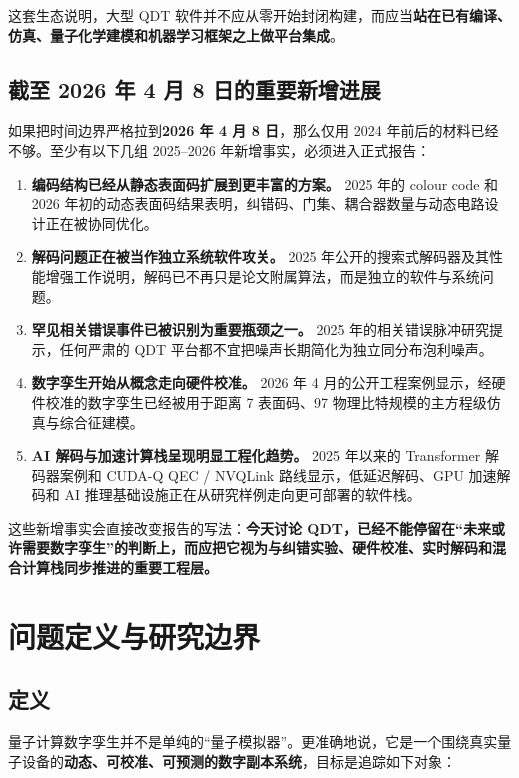 \documentclass[11pt,a4paper]{article}
\newcommand{\QDT}{QDT}
\begin{document}
这套生态说明，大型 \QDT{} 软件并不应从零开始封闭构建，而应当\textbf{站在已有编译、仿真、量子化学建模和机器学习框架之上做平台集成}。

\subsection{截至 2026 年 4 月 8 日的重要新增进展}

如果把时间边界严格拉到\textbf{2026 年 4 月 8 日}，那么仅用 2024 年前后的材料已经不够。至少有以下几组 2025--2026 年新增事实，必须进入正式报告：

\begin{enumerate}
  \item \textbf{编码结构已经从静态表面码扩展到更丰富的方案。} 2025 年的 colour code 和 2026 年初的动态表面码结果表明，纠错码、门集、耦合器数量与动态电路设计正在被协同优化。
  \item \textbf{解码问题正在被当作独立系统软件攻关。} 2025 年公开的搜索式解码器及其性能增强工作说明，解码已不再只是论文附属算法，而是独立的软件与系统问题。
  \item \textbf{罕见相关错误事件已被识别为重要瓶颈之一。} 2025 年的相关错误脉冲研究提示，任何严肃的 \QDT{} 平台都不宜把噪声长期简化为独立同分布泡利噪声。
  \item \textbf{数字孪生开始从概念走向硬件校准。} 2026 年 4 月的公开工程案例显示，经硬件校准的数字孪生已经被用于距离 7 表面码、97 物理比特规模的主方程级仿真与综合征建模。
  \item \textbf{AI 解码与加速计算栈呈现明显工程化趋势。} 2025 年以来的 Transformer 解码器案例和 CUDA-Q QEC / NVQLink 路线显示，低延迟解码、GPU 加速解码和 AI 推理基础设施正在从研究样例走向更可部署的软件栈。
\end{enumerate}

这些新增事实会直接改变报告的写法：\textbf{今天讨论 QDT，已经不能停留在“未来或许需要数字孪生”的判断上，而应把它视为与纠错实验、硬件校准、实时解码和混合计算栈同步推进的重要工程层。}

\section{问题定义与研究边界}

\subsection{定义}

量子计算数字孪生并不是单纯的“量子模拟器”。更准确地说，它是一个围绕真实量子设备的\textbf{动态、可校准、可预测的数字副本系统}，目标是追踪如下对象：
\end{document}
